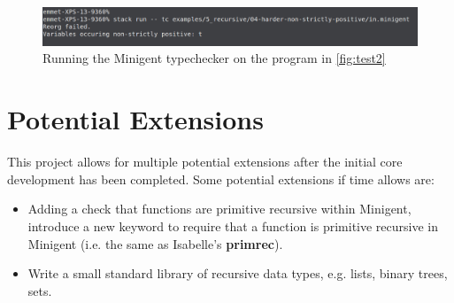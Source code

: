\begin{figure}
    \centering
    \includegraphics[width=\linewidth]{content/test2result.png}
    \caption{Running the Minigent typechecker on the program in \autoref{fig:test2}}
    \label{fig:test2result}
\end{figure}

\section{Potential Extensions}
\label{sec:proposedextensions}

This project allows for multiple potential extensions after the initial core development has been completed.
Some potential extensions if time allows are:

\begin{itemize}
    \item Adding a check that functions are primitive recursive within Minigent, introduce a new keyword
          to require that a function is primitive recursive in Minigent (i.e. the same as
          Isabelle's \textbf{primrec}).
    \item Write a small standard library of recursive data types, e.g. lists, binary trees, 
          sets.
\end{itemize}
